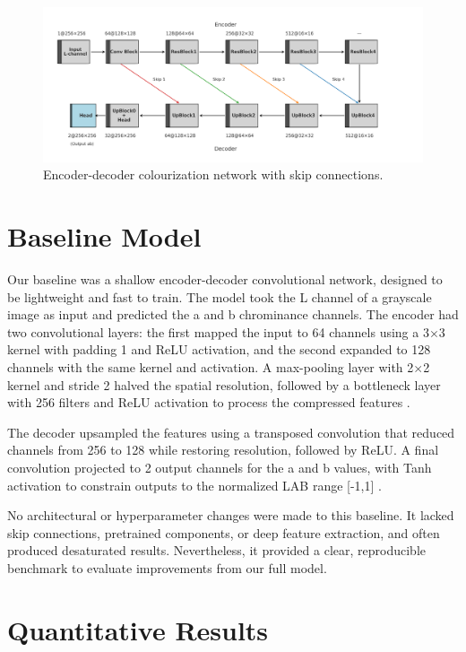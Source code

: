 \documentclass{article} %
\begin{document}
\begin{figure}[htbp]            %
  \centering
  \includegraphics[width=1.1\linewidth]{Figs/architecture-diagram.png}
  \caption{Encoder-decoder colourization network with skip connections.}
  \label{fig:architecture}
\end{figure}

\section{Baseline Model}
\label{baseline}

Our baseline was a shallow encoder-decoder convolutional network, designed to be lightweight and fast to train. The model took the L channel of a grayscale image as input and predicted the a and b 
chrominance channels. The encoder had two convolutional layers: the first mapped the input to 64 channels using a 3$\times$3 kernel with padding 1 and ReLU activation, and the second expanded to 128 
channels with the same kernel and activation. A max-pooling layer with 2$\times$2 kernel and stride 2 halved the spatial resolution, followed by a bottleneck layer with 256 filters and ReLU activation 
to process the compressed features \citep{leatvanich2025image}.

The decoder upsampled the features using a transposed convolution that reduced channels from 256 to 128 while restoring resolution, followed by ReLU. A final convolution projected to 2 output channels 
for the a and b values, with Tanh activation to constrain outputs to the normalized LAB range [-1,1] \citep{rosebrock2019bwcolorization}.

No architectural or hyperparameter changes were made to this baseline. It lacked skip connections, pretrained components, or deep feature extraction, and often produced desaturated results. Nevertheless, 
it provided a clear, reproducible benchmark to evaluate improvements from our full model.

\section{Quantitative Results}
\label{quant_results}
\end{document}
